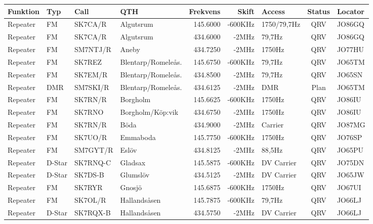 \begin{longtable}{llllrrlcl}

\textbf{Funktion} & \textbf{Typ} & \textbf{Call} & \textbf{QTH} & \textbf{Frekvens} & \textbf{Skift} & 
\textbf{Access} & \textbf{Status} & \textbf{Locator} \\ \hline \endhead

Repeater & FM     & SK7CA/R  & Algutsrum           & 145.6000  & -600KHz & 1750/79,7Hz  & QRV  & JO86GQ \\
Repeater & FM     & SK7CA/R  & Algutsrum           & 434.6000  & -2MHz   & 79,7Hz       & QRV  & JO86GQ \\
Repeater & FM     & SM7NTJ/R & Aneby               & 434.7250  & -2MHz   & 1750Hz       & QRV  & JO77HU \\
Repeater & FM     & SK7REZ   & Blentarp/Romeleås.  & 145.6750  & -600KHz & 79,7Hz       & QRV  & JO65TM \\
Repeater & FM     & SK7EM/R  & Blentarp/Romeleås.  & 434.8500  & -2MHz   & 79,7Hz       & QRV  & JO65SN \\
Repeater & DMR    & SM7SKI/R & Blentarp/Romeleås.  & 434.6125  & -2MHz   & DMR          & Plan & JO65TM \\
Repeater & FM     & SK7RN/R  & Borgholm            & 145.6625  & -600KHz & 1750Hz       & QRV  & JO86IU \\
Repeater & FM     & SK7RNO   & Borgholm/Köp:vik    & 434.6750  & -2MHz   & 1750Hz       & QRV  & JO86IU \\
Repeater & FM     & SK7RN/R  & Böda                & 434.9000  & -2MHz   & Carrier      & QRV  & JO87MG \\
Repeater & FM     & SK7UO/R  & Emmaboda            & 145.7750  & -600KHz & 1750Hz       & QRV  & JO76SP \\
Repeater & FM     & SM7GYT/R & Eslöv               & 434.8125  & -2MHz   & 88,5Hz       & QRV  & JO65PU \\
Repeater & D-Star & SK7RNQ-C & Gladsax             & 145.5875  & -600KHz & DV Carrier   & QRV  & JO75DN \\
Repeater & D-Star & SK7DS-B  & Glumslöv            & 434.5125  & -2MHz   & DV Carrier   & QRV  & JO65JW \\
Repeater & FM     & SK7RYR   & Gnosjö              & 145.6875  & -600KHz & 1750Hz       & QRV  & JO67UI \\
Repeater & FM     & SK7OL/R  & Hallandsåsen        & 145.7875  & -600KHz & 79,7Hz       & QRV  & JO66LJ \\
Repeater & D-Star & SK7RQX-B & Hallandsåsen        & 434.5750  & -2MHz   & DV Carrier   & QRV  & JO66LJ \\

\end{longtable}

